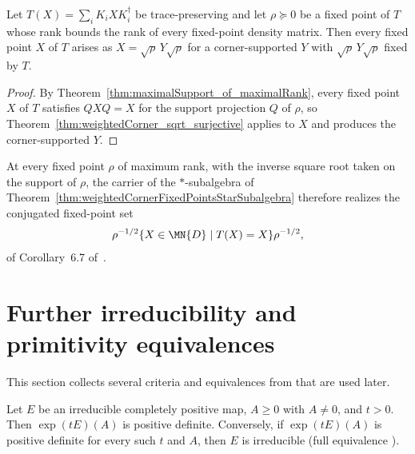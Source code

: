 \begin{theorem}%
    \label{thm:weightedCorner_sqrt_eq_of_maximalRank}
    \leanok
    Let $T(X)=\sum_iK_iXK_i^\dagger$ be trace-preserving and let
    $\rho\succeq0$ be a fixed point of $T$ whose rank bounds the rank of
    every fixed-point density matrix. Then every fixed point $X$ of $T$
    arises as $X=\sqrt{\rho}\,Y\sqrt{\rho}$ for a corner-supported $Y$ with
    $\sqrt{\rho}\,Y\sqrt{\rho}$ fixed by $T$.
\end{theorem}

\begin{proof}
    \leanok
    By Theorem~\ref{thm:maximalSupport_of_maximalRank}, every fixed point
    $X$ of $T$ satisfies $QXQ=X$ for the support projection $Q$ of $\rho$,
    so Theorem~\ref{thm:weightedCorner_sqrt_surjective} applies to $X$ and
    produces the corner-supported $Y$.
\end{proof}

At every fixed point $\rho$ of maximum rank, with the inverse square root
taken on the support of $\rho$, the carrier of the $*$-subalgebra of
Theorem~\ref{thm:weightedCornerFixedPointsStarSubalgebra} therefore realizes
the conjugated fixed-point set
\begin{align}
    \rho^{-1/2}
    \{X\in\MN{D}\mid T(X)=X\}
    \rho^{-1/2},
    \notag
\end{align}
of Corollary~6.7 of~\cite{Wolf2012Quantum}.

\section{Further irreducibility and primitivity equivalences}

This section collects several criteria and equivalences from
\cite[Theorems~6.2, 6.7, 6.8]{Wolf2012Quantum} that are used later.

\begin{theorem}%
    \label{thm:wolf_6_2_item_3}
    \leanok
    Let $E$ be an irreducible completely positive map, $A\geq0$ with
    $A\neq0$, and $t>0$. Then $\exp(tE)(A)$ is positive definite.
    Conversely, if $\exp(tE)(A)$ is positive definite for every such $t$
    and $A$, then $E$ is irreducible (full equivalence
    ).
\end{theorem}

